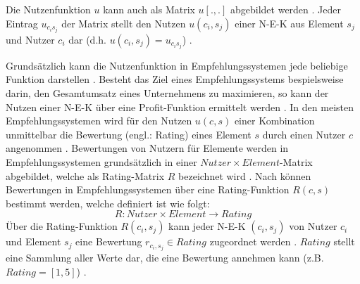 Die Nutzenfunktion $u$ kann auch als Matrix $u[.,.]$ abgebildet werden \cite[S. 1]{dekhtyar:misc}.
Jeder Eintrag $u_{c_{i}s_{j}}$ der Matrix stellt den Nutzen $u(c_{i},s_{j})$ einer \ac{N-E-K} aus Element $s_{j}$ und Nutzer $c_{i}$ dar (d.h. $u(c_{i},s_{j}) = u_{c_{i}s_{j}}$) \cite[S. 1]{dekhtyar:misc}.

Grundsätzlich kann die Nutzenfunktion in Empfehlungssystemen jede beliebige Funktion darstellen \cite[S. 735]{adomavicius:inproceedings}.
Besteht das Ziel eines Empfehlungssystems bespielsweise darin, den Gesamtumsatz eines Unternehmens zu maximieren, so kann der Nutzen einer \ac{N-E-K} über eine Profit-Funktion ermittelt werden \cite[S. 735]{adomavicius:inproceedings}\cite[S. 11]{recommenderSystems:2016}\cite[S. 1]{jannach:article}\cite[S. 896]{adomavicius:article}.
In den meisten Empfehlungssystemen wird für den Nutzen $u(c,s)$ einer Kombination unmittelbar die Bewertung (engl.: Rating) eines Element $s$ durch einen Nutzer $c$ angenommen \cite[S. 735]{adomavicius:inproceedings}\cite[S. 9]{ricci:inbook}\cite[S. 11]{recommenderSystems:2016}\cite[S. 1]{dekhtyar:misc}.
Bewertungen von Nutzern für Elemente werden in Empfehlungssystemen grundsätzlich in einer $Nutzer \times Element$-Matrix abgebildet, welche als Rating-Matrix $R$ bezeichnet wird \cite[S. 87]{ekstrand:article}.
Nach \textcite[S. 48f.]{adomavicius:inproceedings:2} können Bewertungen in Empfehlungssystemen über eine Rating-Funktion $R(c,s)$ bestimmt werden, welche definiert ist wie folgt:
\begin{equation}\label{eq10}
    R: Nutzer \times Element \rightarrow Rating
\end{equation}
Über die Rating-Funktion $R(c_{i},s_{j})$ kann jeder \ac{N-E-K} $(c_{i},s_{j})$ von Nutzer $c_{i}$ und Element $s_{j}$ eine Bewertung $r_{c_{i},s_{j}} \in Rating$ zugeordnet werden \cite[S. 42]{ning:inbook}.
$Rating$ stellt eine Sammlung aller Werte dar, die eine Bewertung annehmen kann (z.B. $Rating = [1,5]$) \cite[S. 41]{ning:inbook}.

